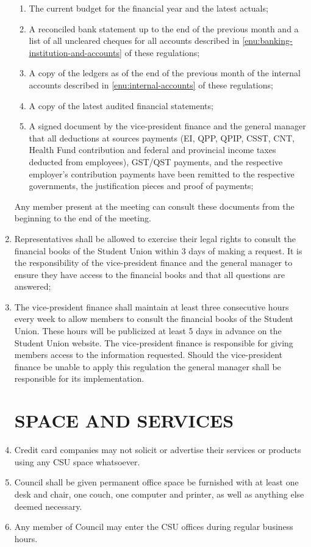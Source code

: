 \documentclass[oneside]{book}
\begin{document}
\begin{enumerate}
\begin{enumerate}
\item The current budget for the financial year and the latest actuals; 
\item A reconciled bank statement up to the end of the previous month and
a list of all uncleared cheques for all accounts described in 
\autoref{enu:banking-institution-and-accounts} of these regulations; 
\item A copy of the ledgers as of the end of the previous month of the internal
accounts described in \autoref{enu:internal-accounts} of these
regulations; 
\item A copy of the latest audited financial statements; 
\item A signed document by the vice-president finance and the general manager
that all deductions at sources payments (EI, QPP, QPIP, CSST, CNT,
Health Fund contribution and federal and provincial income taxes deducted
from employees), GST/QST payments, and the respective employer's contribution
payments have been remitted to the respective governments, the justification
pieces and proof of payments; 
\end{enumerate}
Any member present at the meeting can consult these documents
from the beginning to the end of the meeting. 
\item Representatives shall be allowed to exercise their legal rights to
consult the financial books of the Student Union within 3 days of
making a request. It is the responsibility of the vice-president finance
and the general manager to ensure they have access to the financial
books and that all questions are answered; 
\item The vice-president finance shall maintain at least three consecutive hours every week to allow 
members to consult the financial books of the
Student Union. These hours will be publicized at least 5 days in advance on the Student Union website. 
The vice-president finance is responsible for giving members access to the information requested. Should the
vice-president finance be unable to apply this regulation the general manager shall be responsible for its
implementation.

\part{\label{SPACE_AND_SERVICES}SPACE AND SERVICES }
\item Credit card companies may not solicit or advertise their services
or products using any CSU space whatsoever. 
\item Council shall be given permanent office space be furnished with at
least one desk and chair, one couch, one computer and printer, as
well as anything else deemed necessary. 
\item Any member of Council may enter the CSU offices during regular business
hours. 


\end{enumerate}
\end{document}
